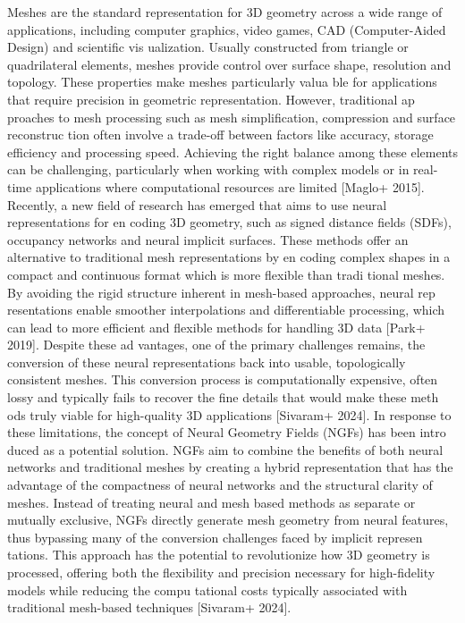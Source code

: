Meshes are the standard representation for 3D geometry across a wide range of applications, 
including computer graphics, video games, CAD (Computer-Aided Design) and scientific vis
ualization. Usually constructed from triangle or quadrilateral elements, meshes provide control 
over surface shape, resolution and topology. These properties make meshes particularly valua
ble for applications that require precision in geometric representation. However, traditional ap
proaches to mesh processing such as mesh simplification, compression and surface reconstruc
tion often involve a trade-off between factors like accuracy, storage efficiency and processing 
speed. Achieving the right balance among these elements can be challenging, particularly when 
working with complex models or in real-time applications where computational resources are 
limited [Maglo+ 2015]. 
Recently, a new field of research has emerged that aims to use neural representations for en
coding 3D geometry, such as signed distance fields (SDFs), occupancy networks and neural 
implicit surfaces. These methods offer an alternative to traditional mesh representations by en
coding complex shapes in a compact and continuous format which is more flexible than tradi
tional meshes. By avoiding the rigid structure inherent in mesh-based approaches, neural rep
resentations enable smoother interpolations and differentiable processing, which can lead to 
more efficient and flexible methods for handling 3D data [Park+ 2019]. Despite these ad
vantages, one of the primary challenges remains, the conversion of these neural representations 
back into usable, topologically consistent meshes. This conversion process is computationally 
expensive, often lossy and typically fails to recover the fine details that would make these meth
ods truly viable for high-quality 3D applications [Sivaram+ 2024]. 
In response to these limitations, the concept of Neural Geometry Fields (NGFs) has been intro
duced as a potential solution. NGFs aim to combine the benefits of both neural networks and 
traditional meshes by creating a hybrid representation that has the advantage of the compactness 
of neural networks and the structural clarity of meshes. Instead of treating neural and mesh
based methods as separate or mutually exclusive, NGFs directly generate mesh geometry from 
neural features, thus bypassing many of the conversion challenges faced by implicit represen
tations. This approach has the potential to revolutionize how 3D geometry is processed, offering 
both the flexibility and precision necessary for high-fidelity models while reducing the compu
tational costs typically associated with traditional mesh-based techniques [Sivaram+ 2024].